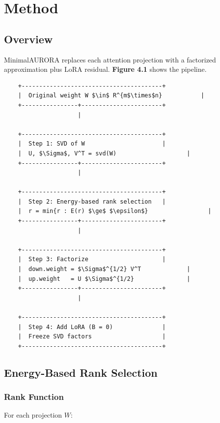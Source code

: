 \section{Method}

\subsection{Overview}

MinimalAURORA replaces each attention projection with a factorized 
approximation plus LoRA residual. \textbf{Figure 4.1} shows the pipeline.

\begin{lstlisting}
    +----------------------------------------+
    |  Original weight W $\in$ R^{m$\times$n}           |
    +----------------+-----------------------+
                     |
                      
    +----------------------------------------+
    |  Step 1: SVD of W                      |
    |  U, $\Sigma$, V^T = svd(W)                    |
    +----------------+-----------------------+
                     |
                      
    +----------------------------------------+
    |  Step 2: Energy-based rank selection   |
    |  r = min{r : E(r) $\ge$ $\epsilon$}                 |
    +----------------+-----------------------+
                     |
                      
    +----------------------------------------+
    |  Step 3: Factorize                     |
    |  down.weight = $\Sigma$^{1/2} V^T             |
    |  up.weight   = U $\Sigma$^{1/2}               |
    +----------------+-----------------------+
                     |
                      
    +----------------------------------------+
    |  Step 4: Add LoRA (B = 0)              |
    |  Freeze SVD factors                    |
    +----------------------------------------+
\end{lstlisting}

\subsection{Energy-Based Rank Selection}

\subsubsection{Rank Function}

For each projection $W$:

